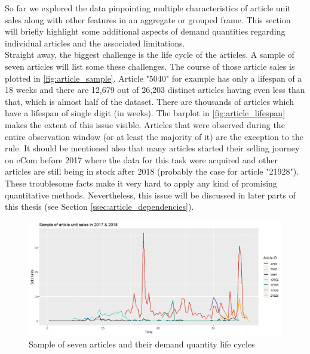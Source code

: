 

So far we explored the data pinpointing multiple characteristics of article unit sales along with other features in an aggregate or grouped frame. This section will briefly highlight some additional aspects of demand quantities regarding individual articles and the associated limitations.
\\

Straight away, the biggest challenge is the life cycle of the articles. A sample of seven articles will list some these challenges. The course of those article sales is plotted in \autoref{fig:article_sample}. Article "5040" for example has only a lifespan of a 18 weeks and there are 12,679 out of 26,203 distinct articles having even less than that, which is almost half of the dataset. There are thousands of articles which have a lifespan of single digit (in weeks). The barplot in \autoref{fig:article_lifespan} makes the extent of this issue visible. Articles that were observed during the entire observation window (or at least the majority of it) are the exception to the rule. It should be mentioned also that many articles started their selling journey on eCom before 2017 where the data for this task were acquired and other articles are still being in stock after 2018 (probably the case for article "21928"). These troublesome facts make it very hard to apply any kind of promising quantitative methods. Nevertheless, this issue will be discussed in later parts of this thesis (see Section \ref{ssec:article_dependencies}).
\\


\begin{figure}[H]
\centering
  \includegraphics[width=0.95\linewidth]{figures/article_sample.png}
  \caption{Sample of seven articles and their demand quantity life cycles}
  \label{fig:article_sample}
\end{figure}


